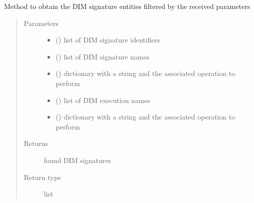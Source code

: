 \begin{fulllineitems}

\begin{fulllineitems}
\label{\detokenize{gsdm.engine:gsdm.engine.query.Query.get_dim_signatures}}
Method to obtain the DIM signature entities filtered by the received parameters
\begin{quote}\begin{description}
\item[{Parameters}] \leavevmode\begin{itemize}
\item {} 
 () \textendash{} list of DIM signature identifiers

\item {} 
 () \textendash{} list of DIM signature names

\item {} 
 () \textendash{} dictionary with a string and the associated operation to perform

\item {} 
 () \textendash{} list of DIM execution names

\item {} 
 () \textendash{} dictionary with a string and the associated operation to perform

\end{itemize}

\item[{Returns}] \leavevmode
found DIM signatures

\item[{Return type}] \leavevmode
list

\end{description}\end{quote}


\end{fulllineitems}
\end{fulllineitems}
